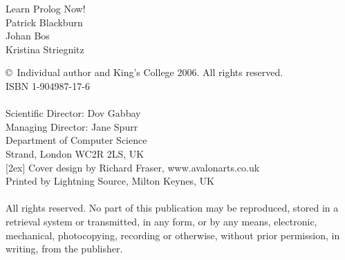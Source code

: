 \documentclass[twoside,leqno,10pt]{book}
\begin{document}
\newpage
\thispagestyle{empty}


\begin{center}
\vspace*{4cm}
{\jlctitleC L\sqz e\sqz a\sqz r\sqz n P\sqz r\sqz o\sqz l\sqz o\sqz g N\sqz o\sqz w\sqz !}\\[16ex]
{\jlctitleB Patrick Blackburn}\\[3ex]
{\jlctitleB Johan Bos}\\[3ex] {\jlctitleB Kristina Striegnitz}
\end{center}


\newpage\thispagestyle{empty}
\mbox{}
\vspace*{3in}

\vfill
\noindent \copyright ~{\sf Individual author and King's College 2006.
All rights reserved.}\\[3ex]
{\sf ISBN 1-904987-17-6}\\
\\
{\sf Scientific Director: Dov Gabbay}\\
{\sf Managing Director: Jane Spurr}\\
{\sf Department of Computer Science}\\
{\sf Strand, London WC2R 2LS, UK}\\
[2ex]
\noindent
{\sf Cover design by Richard Fraser, www.avalonarts.co.uk}\\
{\sf Printed by Lightning Source, Milton Keynes, UK}\\[.5ex]


\noindent \hrulefill\\
\noindent \footnotesize{\sf All rights reserved.  No part of this publication may be reproduced, stored in a retrieval system or transmitted, in any form, or by any means, electronic, mechanical, photocopying, recording or otherwise, without prior permission, in writing, from the publisher.}
\end{document}
